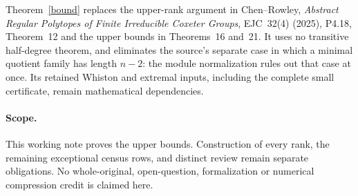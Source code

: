\documentclass[11pt,a4paper]{article}
\begin{document}
Theorem~\ref{bound} replaces the upper-rank argument in Chen--Rowley,
\emph{Abstract Regular Polytopes of Finite Irreducible Coxeter Groups},
EJC~32(4) (2025), P4.18, Theorem~12 and the upper bounds in
Theorems~16 and~21. It uses no transitive half-degree theorem, and
eliminates the source's separate case in which a minimal quotient
family has length $n-2$: the module normalization rules out that
case at once. Its retained Whiston and extremal inputs, including
the complete small certificate, remain mathematical dependencies.

\paragraph{Scope.}
This working note proves the upper bounds. Construction of every rank,
the remaining exceptional census rows, and distinct review remain
separate obligations. No whole-original, open-question, formalization
or numerical compression credit is claimed here.
\end{document}
